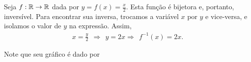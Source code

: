\begin{exem}
    Seja $f:\mathbb{R}\to\mathbb{R}$ dada por $y=f(x)=\frac{x}{2}$. Esta função é bijetora e, portanto, inversível. Para encontrar sua inversa, trocamos a variável $x$ por $y$ e vice-versa, e isolamos o valor de $y$ na expressão. Assim,
    \begin{align*}
        x =\frac{y}{2} \ \  \Rightarrow \ \ y =2x \Rightarrow \ \ f^{-1}(x) =2x.
    \end{align*}

    Note que seu gráfico é dado por
    \begin{center}
    \end{center}
\end{exem}

